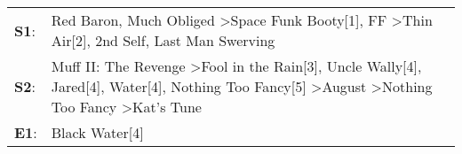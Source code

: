 \begin{supertabular}{p{0.03\textwidth}p{0.92\textwidth}}
 \textbf{S1}:  &                                                                                                                                Red Baron\textsuperscript{}, \enspace Much Obliged\textsuperscript{} \textgreater \enspace Space Funk Booty[1]\textsuperscript{}, \enspace FF\textsuperscript{} \textgreater \enspace Thin Air[2]\textsuperscript{}, \enspace 2nd Self\textsuperscript{}, \enspace Last Man Swerving\textsuperscript{}  \enspace  \\
 \textbf{S2}:  &  Muff II: The Revenge\textsuperscript{} \textgreater \enspace Fool in the Rain[3]\textsuperscript{}, \enspace Uncle Wally[4]\textsuperscript{}, \enspace Jared[4]\textsuperscript{}, \enspace Water[4]\textsuperscript{}, \enspace Nothing Too Fancy[5]\textsuperscript{} \textgreater \enspace August\textsuperscript{} \textgreater \enspace Nothing Too Fancy\textsuperscript{} \textgreater \enspace Kat's Tune\textsuperscript{}  \enspace  \\
 \textbf{E1}:  &                                                                                                                                                                                                                                                                                                                                                                                                      Black Water[4]\textsuperscript{}  \enspace  \\
\end{supertabular}

